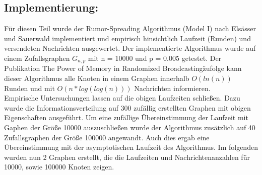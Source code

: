\documentclass[12pt,a4paper]{report}
\begin{document}
\subsection*{Implementierung:}
Für diesen Teil wurde der Rumor-Spreading Algorithmus (Model I) nach Elsässer und Sauerwald implementiert und empirisch hinsichtlich Laufzeit (Runden) und versendeten Nachrichten ausgewertet. Der implementierte Algorithmus wurde auf einem 
Zufallsgraphen $G_{n,p}$ mit n = 10000 und p = 0.005 getestet.
Der Publikation \"The Power of Memory in Randomized Broadcasting\" zufolge kann dieser Algorithmus alle Knoten in einem
Graphen innerhalb $O(ln(n))$ Runden und mit $O(n * log(log(n)))$ Nachrichten informieren.\\
Empirische Untersuchungen lassen auf die obigen Laufzeiten schließen.
Dazu wurde die Informationsverteilung auf 300 zufällig erstellten Graphen mit obigen Eigenschaften  ausgeführt.
Um eine zufällige Übereinstimmung der Laufzeit mit Gaphen der Größe 10000 auszuschließen wurde der Algorithmus
zusätzlich auf 40 Zufallsgraphen der Größe 100000 angewandt. Auch dies ergab eine Übereinstimmung mit der asymptotischen
Laufzeit des Algorithmus. Im folgenden wurden nun 2 Graphen erstellt, die die Laufzeiten und Nachrichtenanzahlen für 10000, sowie 100000 Knoten zeigen.



\end{document}
